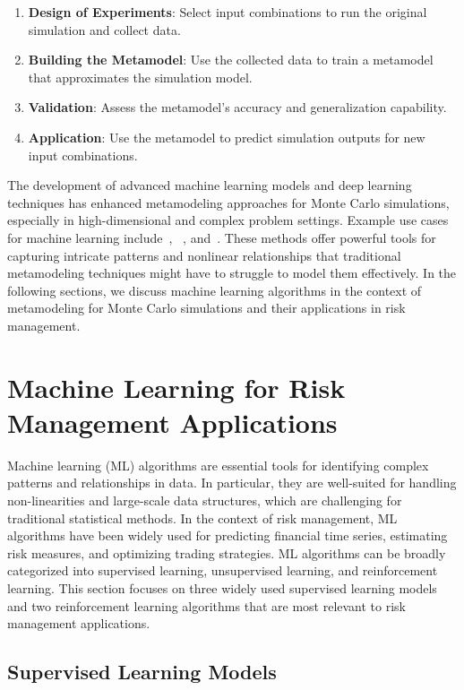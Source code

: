 \begin{enumerate} 
    \item \textbf{Design of Experiments}: Select input combinations to run the original simulation and collect data. 
    \item \textbf{Building the Metamodel}: Use the collected data to train a metamodel that approximates the simulation model. 
    \item \textbf{Validation}: Assess the metamodel's accuracy and generalization capability.
    \item \textbf{Application}: Use the metamodel to predict simulation outputs for new input combinations.
\end{enumerate}

The development of advanced machine learning models and deep learning techniques has enhanced metamodeling approaches for Monte Carlo simulations, especially in high-dimensional and complex problem settings.
Example use cases for machine learning include~\cite{jin2020deep}, ~\cite{tang2020deep}, and~\cite{rosen2012metamodeling}.
These methods offer powerful tools for capturing intricate patterns and nonlinear relationships that traditional metamodeling techniques might have to struggle to model them effectively.
In the following sections, we discuss machine learning algorithms in the context of metamodeling for Monte Carlo simulations and their applications in risk management.

\section{Machine Learning for Risk Management Applications}

Machine learning (ML) algorithms are essential tools for identifying complex patterns and relationships in data. 
In particular, they are well-suited for handling non-linearities and large-scale data structures, which are challenging for traditional statistical methods. 
In the context of risk management, ML algorithms have been widely used for predicting financial time series, estimating risk measures, and optimizing trading strategies.
ML algorithms can be broadly categorized into supervised learning, unsupervised learning, and reinforcement learning.
This section focuses on three widely used supervised learning models and two reinforcement learning algorithms that are most relevant to risk management applications.

\subsection{Supervised Learning Models}


